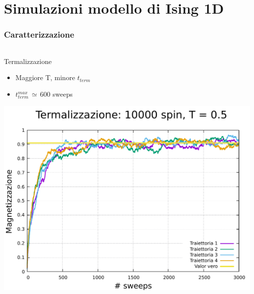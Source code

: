 \section{Simulazioni modello di Ising 1D}

\begin{frame}
    \frametitle{Caratterizzazione}
    \framesubtitle{}

    \begin{columns}
        \begin{column}{0.33\textwidth}
            \begin{block}{Termalizzazione}

                \begin{itemize}[itemsep=0.5em, label=$\diamond$]
                    \item Maggiore T, minore $t_{term}$
                    \item $t_{term}^{max}\,\simeq\,600$ sweeps
                \end{itemize}

                \vspace{0.5cm}

                \centering
                \includegraphics[width=\textwidth]{Immagini/simIsing1D/term_10000_1.5.pdf}
            
            \end{block}
        \end{column}
    

\end{columns}
\end{frame}

